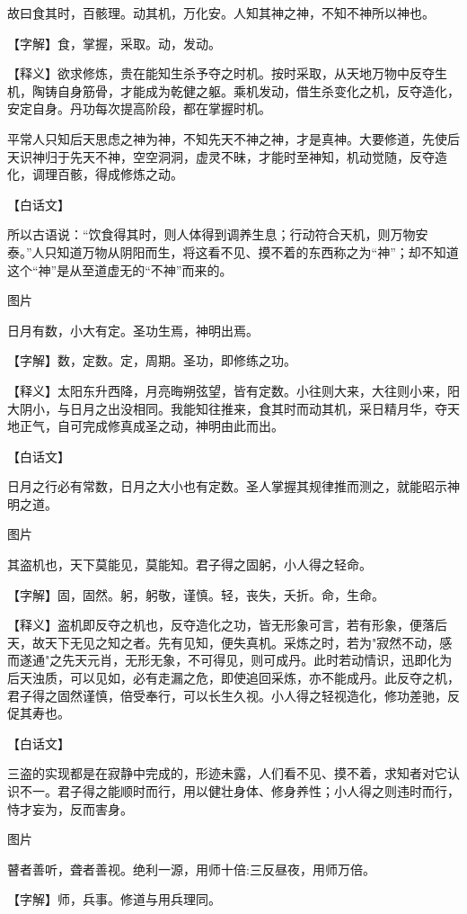 \documentclass[12pt,UTF8]{ctexbook}
\begin{document}
故曰食其时，百骸理。动其机，万化安。人知其神之神，不知不神所以神也。


【字解】食，掌握，采取。动，发动。


【释义】欲求修炼，贵在能知生杀予夺之时机。按时采取，从天地万物中反夺生机，陶铸自身筋骨，才能成为乾健之躯。乘机发动，借生杀变化之机，反夺造化，安定自身。丹功每次提高阶段，都在掌握时机。


平常人只知后天思虑之神为神，不知先天不神之神，才是真神。大要修道，先使后天识神归于先天不神，空空洞洞，虚灵不昧，才能时至神知，机动觉随，反夺造化，调理百骸，得成修炼之动。


【白话文】


所以古语说：“饮食得其时，则人体得到调养生息；行动符合天机，则万物安泰。”人只知道万物从阴阳而生，将这看不见、摸不着的东西称之为“神”；却不知道这个“神”是从至道虚无的“不神”而来的。


图片​


日月有数，小大有定。圣功生焉，神明出焉。


【字解】数，定数。定，周期。圣功，即修练之功。


【释义】太阳东升西降，月亮晦朔弦望，皆有定数。小往则大来，大往则小来，阳大阴小，与日月之出没相同。我能知往推来，食其时而动其机，采日精月华，夺天地正气，自可完成修真成圣之动，神明由此而出。


【白话文】


日月之行必有常数，日月之大小也有定数。圣人掌握其规律推而测之，就能昭示神明之道。


图片​


其盗机也，天下莫能见，莫能知。君子得之固躬，小人得之轻命。


【字解】固，固然。躬，躬敬，谨慎。轻，丧失，夭折。命，生命。


【释义】盗机即反夺之机也，反夺造化之功，皆无形象可言，若有形象，便落后天，故天下无见之知之者。先有见知，便失真机。采炼之时，若为"寂然不动，感而遂通"之先天元肖，无形无象，不可得见，则可成丹。此时若动情识，迅即化为后天浊质，可以见如，必有走漏之危，即使追回采炼，亦不能成丹。此反夺之机，君子得之固然谨慎，倍受奉行，可以长生久视。小人得之轻视造化，修功差驰，反促其寿也。


【白话文】


三盗的实现都是在寂静中完成的，形迹未露，人们看不见、摸不着，求知者对它认识不一。君子得之能顺时而行，用以健壮身体、修身养性；小人得之则违时而行，恃才妄为，反而害身。


图片​


瞽者善听，聋者善视。绝利一源，用师十倍:三反昼夜，用师万倍。


【字解】师，兵事。修道与用兵理同。
\end{document}
